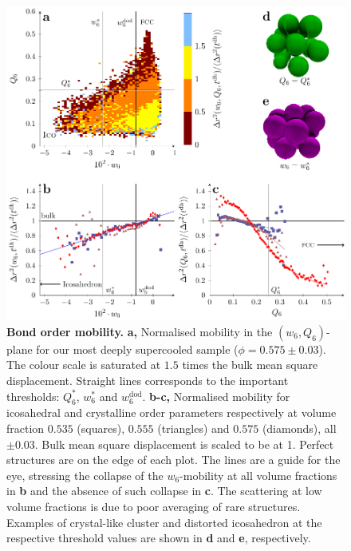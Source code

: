 \clearpage

\begin{figure}
\begin{center}
\includegraphics{generate_figures-figure2.pdf}
\end{center}
\caption{\textbf{Bond order mobility.} {\bf a,} Normalised mobility in the $(w_6, Q_6)$-plane for our most deeply supercooled sample ($\phi = 0.575 \pm 0.03$). The colour scale is saturated at $1.5$ times the bulk mean square displacement. Straight lines corresponds to the important thresholds: $Q_6^*$, $w_6^*$ and $w_6^\text{dod}$. {\bf b-c,} Normalised mobility for icosahedral and crystalline order parameters respectively at volume fraction $0.535$ (squares), $0.555$ (triangles) and $0.575$ (diamonds), all $\pm 0.03$. Bulk mean square displacement is scaled to be at 1. Perfect structures are on the edge of each plot. The lines are a guide for the eye, stressing the collapse of the $w_6$-mobility at all volume fractions in {\bf b} and the absence of such collapse in {\bf c}. The scattering at low volume fractions is due to poor averaging of rare structures. Examples of crystal-like cluster and distorted icosahedron at the respective threshold values are shown in \textbf{d} and \textbf{e}, respectively.}
	\label{fig:msd_Q6_w6}
\end{figure}

\clearpage

